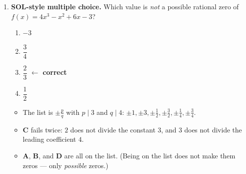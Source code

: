 \documentclass[10pt]{article}
\begin{document}
\begin{enumerate}[leftmargin=1.8em, itemsep=11pt]
    \vspace{3pt}
    Write the correct list: 

  \item \textbf{SOL-style multiple choice.} Which value is \emph{not} a possible rational zero of
    $f(x) = 4x^3 - x^2 + 6x - 3$?
    \begin{enumerate}[label=\Alph*., leftmargin=1.9em, itemsep=1pt]
      \item $-3$
      \item $\dfrac{3}{4}$
      \item $\dfrac{2}{3}$ \quad \textcolor{keyred}{\textbf{$\leftarrow$ correct}}
      \item $\dfrac{1}{2}$
    \end{enumerate}
    \begin{itemize}[leftmargin=1.5em, nosep]
      \item The list is $\pm\frac{p}{q}$ with $p \mid 3$ and $q \mid 4$: \; $\pm 1, \pm 3, \pm\frac12, \pm\frac32, \pm\frac14, \pm\frac34$.
      \item \textbf{C} fails twice: $2$ does not divide the constant $3$, and $3$ does not divide the leading coefficient $4$.
      \item \textbf{A}, \textbf{B}, and \textbf{D} are all on the list. (Being on the list does not make them zeros --- only \emph{possible} zeros.)
    \end{itemize}
\end{enumerate}
\end{document}

